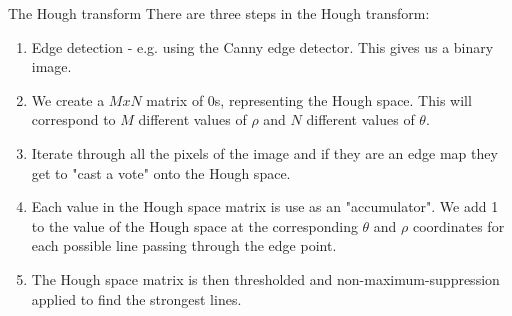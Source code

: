 \documentclass[9pt, aspectratio=169]{beamer}
\begin{document}
\begin{frame}
    {The Hough transform}
    There are three steps in the Hough transform:

    \begin{enumerate}[<+->]
        \item Edge detection - e.g. using the Canny edge detector. This gives us a binary image.
        \item We create a $M x N$ matrix of 0s, representing the Hough space. This will correspond to $M$ different values of $\rho$ and $N$ different values of $\theta$.
        \item Iterate through all the pixels of the image and if they are an edge map they get to "cast a vote" onto the Hough space.
        \item Each value in the Hough space matrix is use as an "accumulator". We add 1 to the value of the Hough space at the corresponding $\theta$ and $\rho$ coordinates for each possible line passing through the edge point.
        \item The Hough space matrix is then thresholded and non-maximum-suppression applied to find the strongest lines.
    \end{enumerate}
\end{frame}
\end{document}
